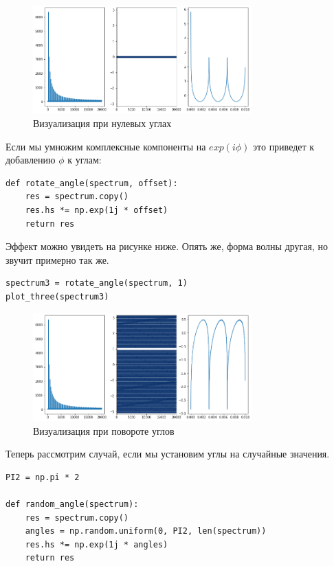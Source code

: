 \documentclass[a4paper,12pt]{report}
\begin{document}
\begin{figure}[H]
        \centering
        \includegraphics[width=0.75\textwidth]{lab6_fig3_6.png}
        \caption{Визуализация при нулевых углах}
        \label{fig:lab6_fig3_6}
\end{figure}

Если мы умножим комплексные компоненты на $exp(i\phi)$ это приведет к добавлению $\phi$ к углам:

\begin{lstlisting}[caption=Функция \texttt{rotate\_angle}]
def rotate_angle(spectrum, offset):
    res = spectrum.copy()
    res.hs *= np.exp(1j * offset)
    return res
\end{lstlisting}

Эффект можно увидеть на рисунке ниже. Опять же, форма волны другая, но звучит примерно так же.

\begin{lstlisting}[caption=Визуализация при повороте углов]
spectrum3 = rotate_angle(spectrum, 1)
plot_three(spectrum3)
\end{lstlisting}

\begin{figure}[H]
        \centering
        \includegraphics[width=0.75\textwidth]{lab6_fig3_7.png}
        \caption{Визуализация при повороте углов}
        \label{fig:lab6_fig3_7}
\end{figure}

Теперь рассмотрим случай, если мы установим углы на случайные значения.

\begin{lstlisting}[caption=Функция \texttt{random\_angle}]
PI2 = np.pi * 2

def random_angle(spectrum):
    res = spectrum.copy()
    angles = np.random.uniform(0, PI2, len(spectrum))
    res.hs *= np.exp(1j * angles)
    return res
\end{lstlisting}
\end{document}
